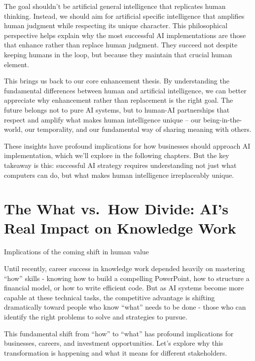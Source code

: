 \documentclass[
  Letterpaper,
]{scrbook}
\begin{document}
The goal shouldn't be artificial general intelligence that replicates
human thinking. Instead, we should aim for artificial specific
intelligence that amplifies human judgment while respecting its unique
character. This philosophical perspective helps explain why the most
successful AI implementations are those that enhance rather than replace
human judgment. They succeed not despite keeping humans in the loop, but
because they maintain that crucial human element.

This brings us back to our core enhancement thesis. By understanding the
fundamental differences between human and artificial intelligence, we
can better appreciate why enhancement rather than replacement is the
right goal. The future belongs not to pure AI systems, but to human-AI
partnerships that respect and amplify what makes human intelligence
unique -- our being-in-the-world, our temporality, and our fundamental
way of sharing meaning with others.

These insights have profound implications for how businesses should
approach AI implementation, which we'll explore in the following
chapters. But the key takeaway is this: successful AI strategy requires
understanding not just what computers can do, but what makes human
intelligence irreplaceably unique.


\chapter{The What vs.~How Divide: AI's Real Impact on Knowledge
Work}\label{the-what-vs.-how-divide-ais-real-impact-on-knowledge-work}

Implications of the coming shift in human value

\hfill\break

Until recently, career success in knowledge work depended heavily on
mastering ``how'' skills - knowing how to build a compelling PowerPoint,
how to structure a financial model, or how to write efficient code. But
as AI systems become more capable at these technical tasks, the
competitive advantage is shifting dramatically toward people who know
``what'' needs to be done - those who can identify the right problems to
solve and strategies to pursue.

This fundamental shift from ``how'' to ``what'' has profound
implications for businesses, careers, and investment opportunities.
Let's explore why this transformation is happening and what it means for
different stakeholders.
\end{document}
